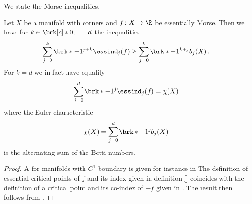 We state the Morse inequalities.
\begin{theorem}
Let $X$ be a manifold with corners and $f\colon X\to\R$ be essentially Morse.
Then we have for $k\in\brk[c]*{0,\dots,d}$ the inequalities
\begin{align*}
  \sum_{j=0}^k \brk*{-1}^{j+k}\essind_j(f)\geq \sum_{j=0}^k\brk*{-1}^{k+j}b_j(X)\,.
\end{align*}
For $k=d$ we in fact have equality
\begin{align*}
  \sum_{j=0}^d \brk*{-1}^{j}\essind_j(f)= \chi(X)
\end{align*}
where the Euler characteristic
\begin{align*}
  \chi(X)=\sum_{j=0}^d\brk*{-1}^{j}b_j(X)
\end{align*}
is the alternating sum of the Betti numbers.
\end{theorem}
\begin{proof}
  A for manifolds with $C^1$ boundary is given for instance in \cite[Theorem 10.2']{Morse1969}
  The definition of essential critical points of $f$ and its index given in definition \ref{} coincides with 
  the definition of a critical point and its co-index of $-f$ given in \cite{Agrach1991}.
  The result then follows from \cite[Theorem 2.4]{Agrach1991}.
\end{proof}

